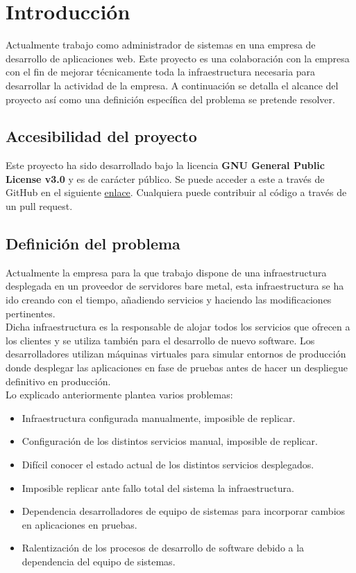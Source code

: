 \chapter {Introducción}
	\begin{paragraph}
		Actualmente trabajo como administrador de sistemas en una empresa de desarrollo de aplicaciones web. Este proyecto es una colaboración con la empresa con el fin de mejorar técnicamente toda la infraestructura necesaria para desarrollar la actividad de la empresa. A continuación se detalla el alcance del proyecto así como una definición específica del problema se pretende resolver.
	\end{paragraph}

\section{Accesibilidad del proyecto}
\begin{text}
	Este proyecto ha sido desarrollado bajo la licencia \textbf{GNU General Public License v3.0} y es de carácter público. Se puede acceder a este a través de GitHub en el siguiente \href{https://github.com/VictorMorenoJimenez/tfg2020}{enlace}. Cualquiera puede contribuir al código a través de un pull request.
\end{text}
\section{Definición del problema}
	\begin{text}
		Actualmente la empresa para la que trabajo dispone de una infraestructura desplegada en un proveedor de servidores bare metal, esta infraestructura se ha ido creando con el tiempo, añadiendo servicios y haciendo las modificaciones pertinentes. \\
		Dicha infraestructura es la responsable de alojar todos los servicios que ofrecen a los clientes y se utiliza también para el desarrollo de nuevo software. Los desarrolladores utilizan máquinas virtuales para simular entornos de producción donde desplegar las aplicaciones en fase de pruebas antes de hacer un despliegue definitivo en producción. \\
		Lo explicado anteriormente plantea varios problemas:
		\begin{itemize}
			\item Infraestructura configurada manualmente, imposible de replicar.
			\item Configuración de los distintos servicios manual, imposible de replicar. 
			\item Difícil conocer el estado actual de los distintos servicios desplegados. 
			\item Imposible replicar ante fallo total del sistema la infraestructura.
			\item Dependencia desarrolladores de equipo de sistemas para incorporar cambios en aplicaciones en pruebas.
			\item Ralentización de los procesos de desarrollo de software debido a la dependencia del equipo de sistemas.
		\end{itemize}
	\end{text}

